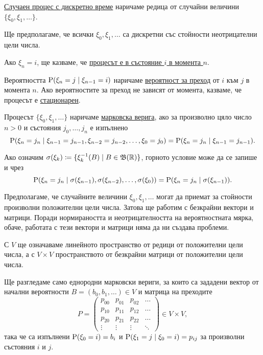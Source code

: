 \documentclass[numbers=endperiod, DIV=15, bibliography=totocnumbered]{scrartcl}
\begin{document}
\begin{definition}
  \uline{Случаен процес с дискретно време} наричаме редица от случайни величини $\{ \xi_0, \xi_1, \ldots \}$.

  Ще предполагаме, че всички $\xi_0, \xi_1, \ldots$ са дискретни със стойности неотрицателни цели числа.

  Ако $\xi_n = i$, ще казваме, че \uline{процесът е в състояние $i$ в момента $n$}.

  Вероятността $\operatorname{P}(\xi_n = j \mid \xi_{n-1} = i)$ наричаме \uline{вероятност за преход} от $i$ към $j$ в момента $n$. Ако вероятностите за преход не зависят от момента, казваме, че процесът е \uline{стационарен}.

  Процесът $\{ \xi_0, \xi_1, \ldots \}$ наричаме \uline{марковска верига}, ако за произволно цяло число $n > 0$ и състояния $j_0, \ldots, j_n$ е изпълнено
  \begin{displaymath}
    \operatorname{P}(\xi_n = j_n \mid \xi_{n-1} = j_{n-1}, \xi_{n-2} = j_{n-2}, \ldots, \xi_0 = j_0) = \operatorname{P}(\xi_n = j_n \mid \xi_{n-1} = j_{n-1}).
  \end{displaymath}

  Ако означим $\sigma(\xi_k) \coloneqq \{ \xi_k^{-1}(B) \mid B \in \mathfrak{B}(\mathbb{R}) \}$, горното условие може да се запише и чрез
  \begin{displaymath}
    \operatorname{P}(\xi_n = j_n \mid \sigma(\xi_{n-1}), \sigma(\xi_{n-2}), \ldots, \sigma(\xi_0)) = \operatorname{P}(\xi_n = j_n \mid \sigma(\xi_{n-1})).
  \end{displaymath}
\end{definition}

\begin{note}
  Предполагаме, че случайните величини $\xi_0, \xi_1, \ldots$ могат да приемат за стойности произволни положителни цели числа. Затова ще работим с безкрайни вектори и матрици. Поради нормираността и неотрицателността на вероятностната мярка, обаче, работата с тези вектори и матрици няма да ни създава проблеми.
\end{note}

С $V$ ще означаваме линейното пространство от редици от положителни цели числа, а с $V \times V$ пространството от безкрайни матрици от положителни цели числа.

Ще разгледаме само еднородни марковски вериги, за които са зададени вектор от начални вероятности $B = (b_0, b_1, \ldots) \in V$ и матрица на преходите
\begin{displaymath}
  P = \begin{pmatrix}
    p_{00} & p_{01} & p_{02} & \ldots \\
    p_{10} & p_{11} & p_{12} & \ldots \\
    p_{20} & p_{21} & p_{22} & \ldots \\
    \vdots & \vdots & \vdots & \ddots
  \end{pmatrix} \in V \times V,
\end{displaymath}
така че са изпълнени $\operatorname{P}(\xi_0 = i) = b_i$ и $\operatorname{P}(\xi_1 = j \mid \xi_0 = i) = p_{ij}$ за произволни състояния $i$ и $j$.
\end{document}
